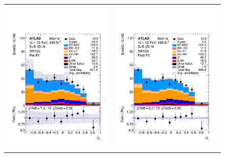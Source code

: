 \begin{table}[]
	\centering
	\tiny
	
	\caption{Post-fit event yields in the S+B\tZc fit in SRs+CRs with data. \TabErrStatSys} 
	\label{tab:stat:tzc:splusb:crsr:yields:postfit_unb}
\end{table} 
\clearpage
\FloatBarrier

\clearpage
\begin{figure}[htbp]
	\centering
	\begin{tabular}{cc}
		\includegraphics[width=.45\textwidth]{Chapters/CH8/figures/SPLUSB_CRSR_DL1rc_unblind/Plots/SR1} &
		\includegraphics[width=.45\textwidth]{Chapters/CH8/figures/SPLUSB_CRSR_DL1rc_unblind/Plots/SR1_postFit} \\

\end{tabular}
\end{figure}
